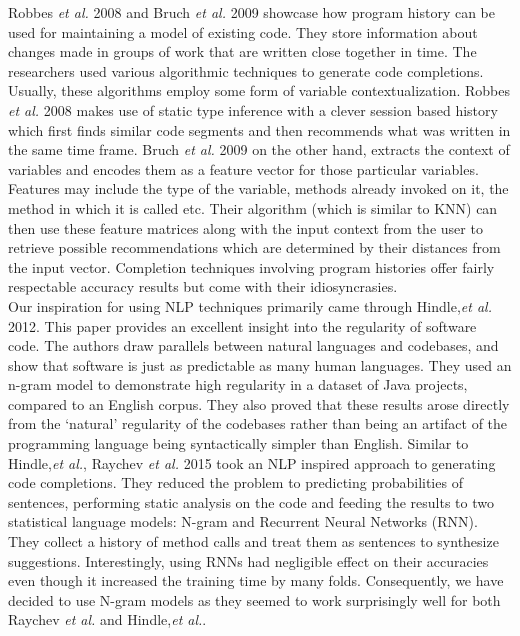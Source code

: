 Robbes \textit{et al.} 2008 and Bruch \textit{et al.} 2009 showcase how program history can be used for maintaining a model of existing code. They store information about changes made in groups of work that are written close together in time. The researchers used various algorithmic techniques to generate code completions. Usually, these algorithms employ some form of variable contextualization. Robbes \textit{et al.} 2008 makes use of static type inference with a clever session based history which first finds similar code segments and then recommends what was written in the same time frame. Bruch \textit{et al.} 2009 on the other hand, extracts the context of variables and encodes them as a feature vector for those particular variables. Features may include the type of the variable, methods already invoked on it, the method in which it is called etc. Their algorithm (which is similar to KNN) can then use these feature matrices along with the input context from the user to retrieve possible recommendations which are determined by their distances from the input vector.  Completion techniques involving program histories offer fairly respectable accuracy results but come with their idiosyncrasies.\\  

Our inspiration for using NLP techniques primarily came through Hindle,\textit{et al.} 2012. This paper provides an excellent insight into the regularity of software code. The authors draw parallels between natural languages and codebases, and show that software is just as predictable as many human languages. They used an n-gram model to demonstrate high regularity in a dataset of Java projects, compared to an English corpus. They also proved that these results arose directly from the ‘natural’ regularity of the codebases rather than being an artifact of the programming language being syntactically simpler than English. Similar to Hindle,\textit{et al.}, Raychev \textit{et al.} 2015 took an NLP inspired approach to generating code completions. They reduced the problem to predicting probabilities of sentences, performing static analysis on the code and feeding the results to two statistical language models: N-gram and Recurrent Neural Networks (RNN). They collect a history of method calls and treat them as sentences to synthesize suggestions. Interestingly, using RNNs had negligible effect on their accuracies even though it increased the training time by many folds. Consequently, we have decided to use N-gram models as they seemed to work surprisingly well for both Raychev \textit{et al.} and Hindle,\textit{et al.}.

